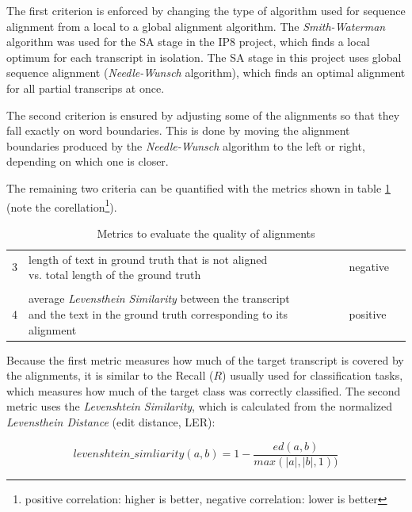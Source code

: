 The first criterion is enforced by changing the type of algorithm used for sequence alignment from a local to a global alignment algorithm. The \textit{Smith-Waterman} algorithm was used for the \ac{SA} stage in the IP8 project, which finds a local optimum for each transcript in isolation. The \ac{SA} stage in this project uses global sequence alignment (\textit{Needle-Wunsch} algorithm), which finds an optimal alignment for all partial transcrips at once.

The second criterion is ensured by adjusting some of the alignments so that they fall exactly on word boundaries. This is done by moving the alignment boundaries produced by the \textit{Needle-Wunsch} algorithm to the left or right, depending on which one is closer. 

The remaining two criteria can be quantified with the metrics shown in table \ref{alignment_quality} (note the corellation\footnote{positive correlation: higher is better, negative correlation: lower is better}).

\begin{table}[!htbp]
	\centering
	\begin{tabular}{llll}
		\toprule
		\thead{criterion} & \thead{metric} & \thead{correlation} \\
		\midrule
		3 & \makecell[l]{length of text in ground truth that is not aligned\\vs. total length of the ground truth} & negative\\ \\ 	
		4 & \makecell[l]{average \textit{Levensthein Similarity} between the transcript\\and the text in the ground truth corresponding to its alignment} & positive \\ 
		\bottomrule
	\end{tabular}
	\caption{Metrics to evaluate the quality of alignments}
	\label{alignment_quality}
\end{table}

Because the first metric measures how much of the target transcript is covered by the alignments, it is similar to the Recall ($R$) usually used for classification tasks, which measures how much of the target class was correctly classified. The second metric uses the \textit{Levenshtein Similarity}, which is calculated from the normalized \textit{Levensthein Distance} (edit distance, \ac{LER}):

\[ 
levenshtein\_simliarity(a,b) = 1 - \frac{ed(a,b)}{max(|a|, |b|, 1))}
\]

